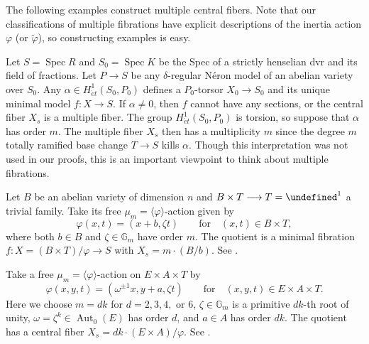 \documentclass[reqno, letterpaper]{amsart}
\numberwithin{equation}{subsection}
\let\AA\undefined
\let\to\longrightarrow
\newcommand{\AA}{\mathbb{A}}
\newcommand{\GG}{\mathbb{G}}
\DeclareMathOperator{\Aut}{Aut}
\DeclareMathOperator{\Spec}{Spec}
\begin{document}
	The following examples construct multiple central fibers. Note that our classifications of multiple fibrations have explicit descriptions of the inertia action $\varphi$ (or $\tilde \varphi$), so constructing examples is easy.
	
	\begin{example} 
		Let $S = \Spec R$ and $S_0 = \Spec K$ be the Spec of a strictly henselian dvr and its field of fractions. Let $P \to S$ be any $\delta$-regular N\'eron model of an abelian variety over $S_0$. Any $\alpha \in H^1_{\acute et} (S_0, P_0)$ defines a $P_0$-torsor $X_0 \to S_0$ and its unique minimal model $f : X \to S$. If $\alpha \neq 0$, then $f$ cannot have any sections, or the central fiber $X_s$ is a multiple fiber. The group $H^1_{\acute et} (S_0, P_0)$ is torsion, so suppose that $\alpha$ has order $m$. The multiple fiber $X_s$ then has a multiplicity $m$ since the degree $m$ totally ramified base change $T \to S$ kills $\alpha$. Though this interpretation was not used in our proofs, this is an important viewpoint to think about multiple fibrations.
	\end{example}
	
	\begin{example}  \label{ex:mI0}
		Let $B$ be an abelian variety of dimension $n$ and $B \times T \to T = \AA^1$ a trivial family. Take its free $\mu_m = \langle \varphi \rangle$-action given by
		\[ \varphi(x, t) = (x + b, \zeta t) \qquad\mbox{for}\quad (x,t) \in B \times T ,\]
		where both $b \in B$ and $\zeta \in \GG_m$ have order $m$. The quotient is a minimal fibration $f : X = (B \times T)/\varphi \to S$ with $X_s = m \cdot (B/b)$. See .
	\end{example}
	
	\begin{example} 
		Take a free $\mu_m = \langle \varphi \rangle$-action on $E \times A \times T$ by
		\[ \varphi(x,y,t) = (\omega^{\pm1} x, y + a, \zeta t) \qquad\mbox{for}\quad (x,y,t) \in E \times A \times T .\]
		Here we choose $m = dk$ for $d = 2,3,4,$ or $6$, $\zeta \in \GG_m$ is a primitive $dk$-th root of unity, $\omega = \zeta^k \in \Aut_0(E)$ has order $d$, and $a \in A$ has order $dk$. The quotient has a central fiber $X_s = dk \cdot (E \times A)/\varphi$. See .
	\end{example}
	
\end{document}
